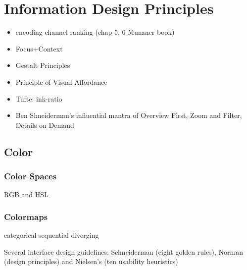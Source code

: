 \section{Information Design Principles}
\begin{itemize}
	\item encoding channel ranking (chap 5, 6 Munzner book)
	\item Focus+Context
	\item Gestalt Principles
	\item Principle of Visual Affordance
	\item Tufte: ink-ratio
	\item Ben Shneiderman’s influential mantra of Overview First, Zoom and Filter, Details on Demand
\end{itemize}



\subsection{Color}

\subsubsection {Color Spaces}
RGB and HSL

\subsubsection {Colormaps}

categorical
sequential
diverging





Several interface design guidelines: Schneiderman (eight golden rules), Norman (design principles) and Nielsen’s (ten usability heuristics)



%
%


